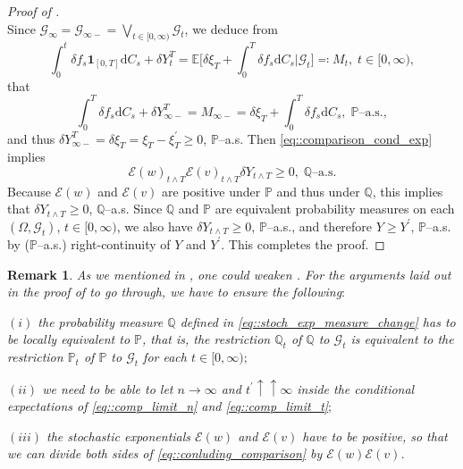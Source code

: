 \documentclass[10pt]{article} %
\newtheorem{remark}[theorem]{Remark}
\newcommand\cE{\mathcal E}
\newcommand\cG{\mathcal G}
\def \E{\mathbb{E}}
\def \P{\mathbb{P}}
\def \Q{\mathbb{Q}}
\newcommand{\1}{\mathbf{1}}
\def\d{\mathrm{d}}
\begin{document}
\begin{proof}[Proof of ]
\begin{equation}
	\end{equation}
	Since $\cG_{\infty} = \cG_{\infty-} = \bigvee_{t \in [0,\infty)} \cG_t$, we deduce from
	\begin{equation*}
		\int_0^t \delta f_s \mathbf{1}_{[0,T]} \d C_s + \delta Y^T_t = \E \bigg[\delta \xi_T + \int_0^T \delta f_s \d C_s \bigg| \cG_t\bigg] \eqqcolon M_t, \; t \in [0,\infty),
	\end{equation*}
	that 
	\begin{equation*}
		\int_0^T \delta f_s \d C_s + \delta Y^T_{\infty-} = M_{\infty-} = \delta \xi_T + \int_0^T \delta f_s \d C_s, \;\text{$\P$--a.s.},
	\end{equation*}
	and thus $\delta Y^T_{\infty-} = \delta\xi_T = \xi_T - \xi^\prime_T \geq 0$, $\P$--a.s. Then \eqref{eq::comparison_cond_exp} implies 
	\begin{equation}\label{eq::conluding_comparison}
		\cE(w)_{t \land T}\cE(v)_{t \land T}\delta Y_{t \land T} \geq 0, \; \text{$\Q$--a.s.}
	\end{equation}
	Because $\cE(w)$ and $\cE(v)$ are positive under $\P$ and thus under $\Q$, this implies that $\delta Y_{t \land T} \geq 0$, $\Q$--a.s. Since $\Q$ and $\P$ are equivalent probability measures on each $(\Omega,\cG_t)$, $t \in [0,\infty)$, we also have $\delta Y_{t \land T} \geq 0$, $\P$--a.s., and therefore $Y \geq Y^\prime$, $\P$--a.s. by ($\P$--a.s.) right-continuity of $Y$ and $Y^\prime$. This completes the proof.
	\endgroup
\end{proof}

\begin{remark}\label{rem::comparison_proof}
	As we mentioned in {\rm{}}, one could weaken {\rm{}}. For the arguments laid out in the proof of {\rm{}} to go through, we have to ensure the following$:$
	
	\medskip
	$(i)$ the probability measure $\Q$ defined in \eqref{eq::stoch_exp_measure_change} has to be locally equivalent to $\P$, that is, the restriction $\Q_t$ of $\Q$ to $\cG_t$ is equivalent to the restriction $\P_t$ of $\P$ to $\cG_t$ for each $t \in [0,\infty);$
	
	\medskip
	$(ii)$ we need to be able to let $n \rightarrow \infty$ and $t^\prime \uparrow\uparrow \infty$ inside the conditional expectations of \eqref{eq::comp_limit_n} and \eqref{eq::comp_limit_t}$;$
	
	\medskip
	$(iii)$ the stochastic exponentials $\cE(w)$ and $\cE(v)$ have to be positive, so that we can divide both sides of \eqref{eq::conluding_comparison} by $\cE(w)\cE(v)$.
\end{remark}
\end{document}
